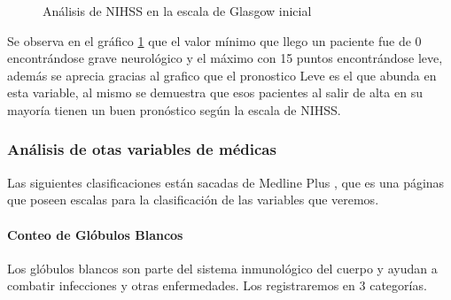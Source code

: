 \begin{center}
    	\begin{figure}[H]
	\centering
	\caption{Análisis de NIHSS en la escala de Glasgow inicial}
	\label{fig:aNISSG}
	\end{figure}
\end{center}
    
    Se observa en el gráfico \ref{fig:aNISSG} que el valor mínimo que llego un paciente fue de 0
encontrándose grave neurológico y el máximo con 15 puntos encontrándose
leve, además se aprecia gracias al grafico que el pronostico Leve es el
que abunda en esta variable, al mismo se demuestra que esos pacientes al
salir de alta en su mayoría tienen un buen pronóstico según la escala de
NIHSS.

    \hypertarget{anuxe1lisis-de-otas-variables-de-muxe9dicas}{%
\subsubsection{Análisis de otas variables de
médicas}\label{anuxe1lisis-de-otas-variables-de-muxe9dicas}}

Las siguientes clasificaciones están sacadas de Medline Plus \cite{med}, que es una páginas que poseen escalas para la clasificación de las variables que veremos.

    \hypertarget{conteo-de-gluxf3bulos-blancos}{%
\paragraph{Conteo de Glóbulos
Blancos}\label{conteo-de-gluxf3bulos-blancos}}

Los glóbulos blancos son parte del sistema inmunológico del cuerpo y
ayudan a combatir infecciones y otras enfermedades. Los registraremos en
3 categorías.

